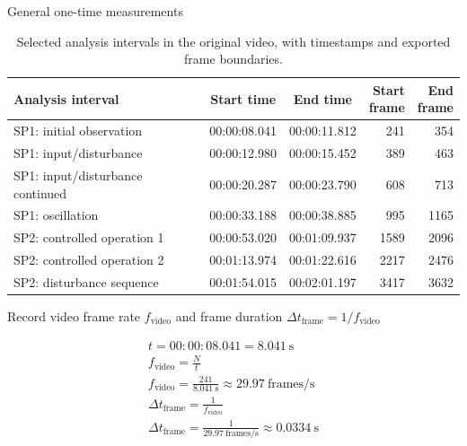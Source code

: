 \documentclass[11pt,a4paper]{article}
\begin{document}
{\Large General one-time measurements}
\begin{table}[htbp]
    \centering
    \small
    \caption{Selected analysis intervals in the original video,
    with timestamps and exported frame boundaries.}
    \label{tab:intervals}
    \begin{tabular}{@{}lccrr@{}}
        \toprule
        Analysis interval
        & Start time
        & End time
        & \shortstack{Start\\frame}
        & \shortstack{End\\frame} \\
        \midrule
        SP1: initial observation
        & 00:00:08.041 & 00:00:11.812 & 241 & 354 \\

        SP1: input/disturbance
        & 00:00:12.980 & 00:00:15.452 & 389 & 463 \\

        SP1: input/disturbance continued
        & 00:00:20.287 & 00:00:23.790 & 608 & 713 \\

        SP1: oscillation
        & 00:00:33.188 & 00:00:38.885 & 995 & 1165 \\

        SP2: controlled operation 1
        & 00:00:53.020 & 00:01:09.937 & 1589 & 2096 \\

        SP2: controlled operation 2
        & 00:01:13.974 & 00:01:22.616 & 2217 & 2476 \\

        SP2: disturbance sequence
        & 00:01:54.015 & 00:02:01.197 & 3417 & 3632 \\
        \bottomrule
    \end{tabular}
\end{table}

Record video frame rate $f_\text{video}$ and frame duration $\Delta t_\text{frame} = 1/f_\text{video}$\newline

\begin{gather}
t = 00{:}00{:}08.041 = 8.041~\text{s} \nonumber \\
f_\text{video} = \frac{N}{t} \label{eq:fvideo} \\
f_\text{video} = \frac{241}{8.041~\text{s}} \approx 29.97~\text{frames/s} \nonumber \\
\Delta t_\text{frame} = \frac{1}{f_\text{video}} \label{eq:dtframe} \\
\Delta t_\text{frame} = \frac{1}{29.97~\text{frames/s}} \approx 0.0334~\text{s} \nonumber
\end{gather}
\end{document}
